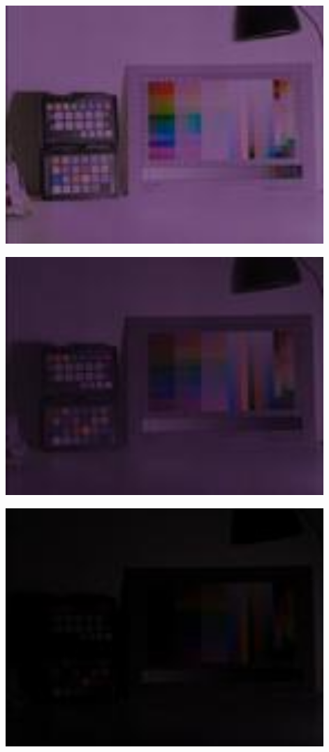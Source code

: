\begin{center}
\includegraphics[height=9cm]{images/100ms-1ms-40-tiny}
\end{center}

\begin{center}
\includegraphics[height=9cm]{images/100ms-1ms-48-tiny}
\end{center}

\begin{center}
\includegraphics[height=9cm]{images/100ms-1ms-56-tiny}
\end{center}

